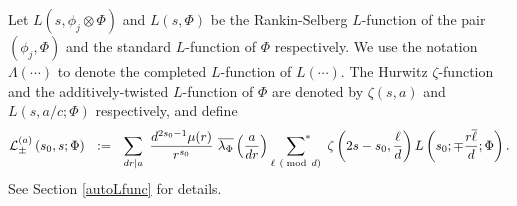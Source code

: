 \documentclass[11pt,reqno]{amsart}
\theoremstyle{definition}
\theoremstyle{definition}
\theoremstyle{remark}
\numberwithin{equation}{section}
\begin{document}
Let  $L\left( s , \phi_{j} \otimes  \Phi \right)$ and $L\left( s, \Phi \right)$ be the Rankin-Selberg $L$-function of  the pair $(\phi_{j}, \Phi)$ and the standard $L$-function of $\Phi$ respectively. We use the notation $\Lambda(\cdots)$ to denote the  completed $L$-function of $L(\cdots)$. The Hurwitz $\zeta$-function and the additively-twisted $L$-function of $\Phi$ are denoted by  $\zeta(s,a)$ and  $L(s, a/c; \Phi)$ respectively,  and define 	
\begin{align}\label{duamoadd}
		\mathcal{L}^{(a)}_{\pm}\left(s_{0}, s; \Phi \right)  \ \ := \ \    \sum_{dr \mid a} \   \frac{d^{2s_{0}-1} \mu(r)}{ r^{s_{0}} }\ \overline{\lambda_{\Phi}}\left( \frac{a}{dr}\right)  \  \sideset{}{^*}{\sum}_{\ell \ (\bmod\, d)} \  \zeta\left( 2s-s_{0}, \frac{\ell}{d}\right) 	L\left( s_{0}; \mp \frac{r\overline{\ell}}{d}; \Phi\right). 
\end{align}
See Section \ref{autoLfunc} for details. 
 



\end{document}
